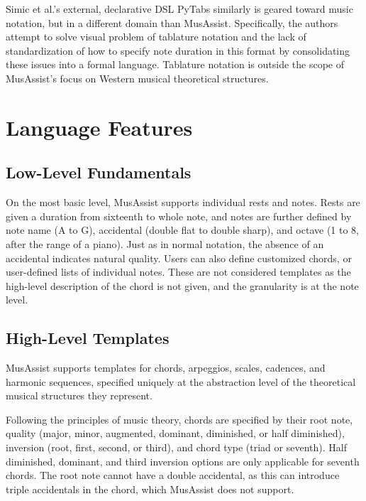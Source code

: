 \documentclass{article}
\begin{document}
Simic et al.’s external, declarative DSL PyTabs similarly is geared toward music notation, but in a different domain than MusAssist. Specifically, the authors attempt to solve visual problem of tablature notation and the lack of standardization of how to specify note duration in this format by consolidating these issues into a formal language. Tablature notation is outside the scope of MusAssist’s focus on Western musical theoretical structures. 
 \cite{simic_bal_dejanovic_vaderna}


\section{Language Features}\label{sec:language_features}
\subsection{Low-Level Fundamentals}
On the most basic level, MusAssist supports individual rests and notes. Rests are given a duration from sixteenth to whole note, and notes are further defined by note name (A to G), accidental (double flat to double sharp), and octave (1 to 8, after the range of a piano). Just as in normal notation, the absence of an accidental indicates natural quality. Users can also define customized chords, or user-defined lists of individual notes. These are not considered templates as the high-level description of the chord is not given, and the granularity is at the note level.

\subsection{High-Level Templates}
MusAssist supports templates for chords, arpeggios, scales, cadences, and harmonic sequences, specified uniquely at the abstraction level of the theoretical musical structures they represent.

Following the principles of music theory, chords are specified by their root note, quality (major, minor, augmented, dominant, diminished, or half diminished), inversion (root, first, second, or third), and chord type (triad or seventh). Half diminished, dominant, and third inversion options are only applicable for seventh chords. The root note cannot have a double accidental, as this can introduce triple accidentals in the chord, which MusAssist does not support.
\end{document}
